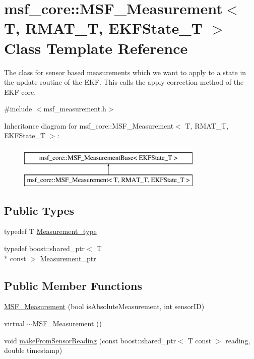 \hypertarget{classmsf__core_1_1MSF__Measurement}{\section{msf\-\_\-core\-:\-:M\-S\-F\-\_\-\-Measurement$<$ T, R\-M\-A\-T\-\_\-\-T, E\-K\-F\-State\-\_\-\-T $>$ Class Template Reference}
\label{classmsf__core_1_1MSF__Measurement}
}


The class for sensor based measurements which we want to apply to a state in the update routine of the E\-K\-F. This calls the apply correction method of the E\-K\-F core.  




{\ttfamily \#include $<$msf\-\_\-measurement.\-h$>$}

Inheritance diagram for msf\-\_\-core\-:\-:M\-S\-F\-\_\-\-Measurement$<$ T, R\-M\-A\-T\-\_\-\-T, E\-K\-F\-State\-\_\-\-T $>$\-:\begin{figure}[H]
\begin{center}
\leavevmode
\includegraphics[height=2.000000cm]{classmsf__core_1_1MSF__Measurement}
\end{center}
\end{figure}
\subsection*{Public Types}
\begin{DoxyCompactItemize}
\item 
typedef T \hyperlink{classmsf__core_1_1MSF__Measurement_ab102d2c17bef09be28cb1403017992b6}{Measurement\-\_\-type}
\item 
typedef boost\-::shared\-\_\-ptr$<$ T \\*
const  $>$ \hyperlink{classmsf__core_1_1MSF__Measurement_afa4f826dadcfd129a50330f078a8dbf8}{Measurement\-\_\-ptr}
\end{DoxyCompactItemize}
\subsection*{Public Member Functions}
\begin{DoxyCompactItemize}
\item 
\hyperlink{classmsf__core_1_1MSF__Measurement_a33143412cbcabec0c16e1c6ad82641d0}{M\-S\-F\-\_\-\-Measurement} (bool is\-Absolute\-Measurement, int sensor\-I\-D)
\item 
virtual \hyperlink{classmsf__core_1_1MSF__Measurement_a922f76000be4c759fb5b0cfa294e2593}{$\sim$\-M\-S\-F\-\_\-\-Measurement} ()
\item 
void \hyperlink{classmsf__core_1_1MSF__Measurement_a345b17105929ac6c70a0a5d21e281a5c}{make\-From\-Sensor\-Reading} (const boost\-::shared\-\_\-ptr$<$ T const  $>$ reading, double timestamp)
\end{DoxyCompactItemize}
